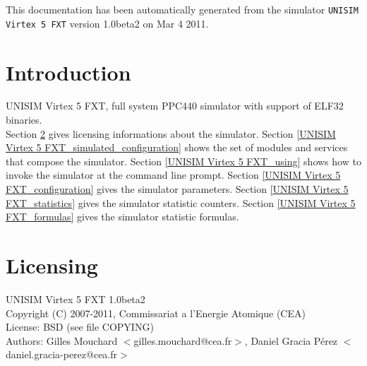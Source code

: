 This documentation has been automatically generated from the simulator \texttt{UNISIM Virtex 5 FXT} version 1.0beta2 on Mar  4 2011.
\section{Introduction}
UNISIM Virtex 5 FXT, full system PPC440 simulator with support of ELF32 binaries.\\
Section \ref{UNISIM Virtex 5 FXT_licensing} gives licensing informations about the simulator.
Section \ref{UNISIM Virtex 5 FXT_simulated_configuration} shows the set of modules and services that compose the simulator.
Section \ref{UNISIM Virtex 5 FXT_using} shows how to invoke the simulator at the command line prompt.
Section \ref{UNISIM Virtex 5 FXT_configuration} gives the simulator parameters.
Section \ref{UNISIM Virtex 5 FXT_statistics} gives the simulator statistic counters.
Section \ref{UNISIM Virtex 5 FXT_formulas} gives the simulator statistic formulas.
\section{Licensing}
\label{UNISIM Virtex 5 FXT_licensing}
UNISIM Virtex 5 FXT 1.0beta2\\
Copyright (C) 2007-2011, Commissariat a l'Energie Atomique (CEA)\\
License: BSD (see file COPYING)\\
Authors: Gilles Mouchard $<$gilles.mouchard@cea.fr$>$, Daniel Gracia P\'erez $<$daniel.gracia-perez@cea.fr$>$\\
